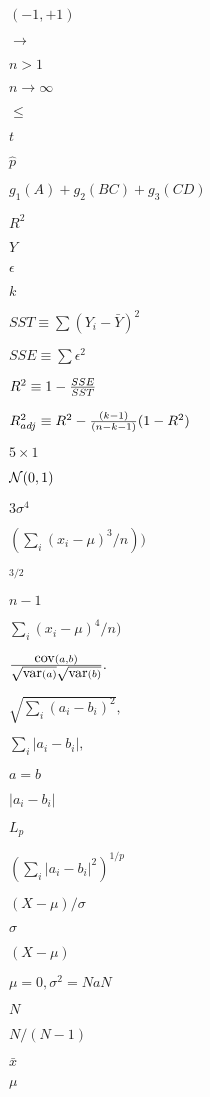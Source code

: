 \documentclass{article}
\begin{document}
$(-1, +1)$
\pagebreak

$\to$
\pagebreak

$n>1$
\pagebreak

$n\to\infty$
\pagebreak

$\leq$
\pagebreak

$t$
\pagebreak

$\hat{p}$
\pagebreak

$g_1(A) + g_2(BC) + g_3(CD)$
\pagebreak

$R^2$
\pagebreak

$Y$
\pagebreak

$\epsilon$
\pagebreak

$k$
\pagebreak

$ SST \equiv \sum (Y_i - \bar Y) ^2 $
\pagebreak

$ SSE \equiv \sum \epsilon ^2 $
\pagebreak

$ R^2 \equiv 1 - {SSE\over SST} $
\pagebreak

$ R^2_{adj} \equiv R^2 - {(k-1)\over (n-k-1)}(1-R^2) $
\pagebreak

$5 \times 1$
\pagebreak

${\cal N}(0,1)$
\pagebreak

$3 \sigma^4$
\pagebreak

$(\sum_i (x_i - \mu)^3/n))$
\pagebreak

$^{3/2}$
\pagebreak

$n-1$
\pagebreak

$\sum_i (x_i - \mu)^4/n)$
\pagebreak

$ {\hbox{cov}(a,b)\over \sqrt{\hbox{var}(a)} \sqrt{\hbox{var}(b)}}.$
\pagebreak

$\sqrt{\sum_i{(a_i - b_i)^2}},$
\pagebreak

$\sum_i{|a_i - b_i|},$
\pagebreak

$a = b$
\pagebreak

$|a_i - b_i|$
\pagebreak

$L_p$
\pagebreak

$\left(\sum_i{|a_i - b_i|^2}\right)^{1/p}$
\pagebreak

$(X-\mu) / \sigma$
\pagebreak

$\sigma$
\pagebreak

$(X-\mu)$
\pagebreak

$\mu=0, \sigma^2=NaN$
\pagebreak

$N$
\pagebreak

$N/(N-1)$
\pagebreak

$\bar x$
\pagebreak

$\mu$
\pagebreak
\end{document}
